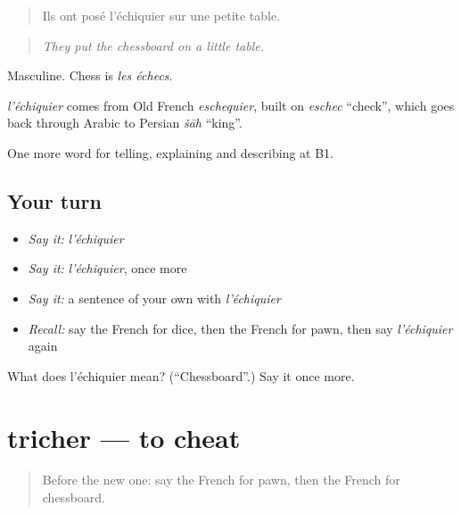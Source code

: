 \begin{quote}
Ils ont posé l'échiquier sur une petite table.
\end{quote}

\begin{quote}
\emph{They put the chessboard on a little table.}
\end{quote}

Masculine. Chess is \emph{les échecs}.

\begin{cousinweb}
\emph{l'échiquier} comes from Old French \emph{eschequier}, built on \emph{eschec} \textquotedblleft{}check\textquotedblright{}, which goes back through Arabic to Persian \emph{šāh} \textquotedblleft{}king\textquotedblright{}.
\end{cousinweb}

\begin{grammarlens}[title={What you've built}]
One more word for telling, explaining and describing at B1.
\end{grammarlens}

\subsection*{Your turn}
\begin{itemize}
\raggedright
  \item \emph{Say it:} \emph{l'échiquier}
  \item \emph{Say it:} \emph{l'échiquier}, once more
  \item \emph{Say it:} a sentence of your own with \emph{l'échiquier}
  \item \emph{Recall:} say the French for dice, then the French for pawn, then say \emph{l'échiquier} again
\end{itemize}

\begin{tcolorbox}[breakable,colback=teal!4,colframe=teal!35!black,title={Before you move on}]
What does l'échiquier mean? (\textquotedblleft{}Chessboard\textquotedblright{}.) Say it once more.
\end{tcolorbox}
\section[tricher]{tricher — to cheat}

\label{lesson:FR-C499-tricher}



\begin{quote}
Before the new one: say the French for pawn, then the French for chessboard.
\end{quote}


